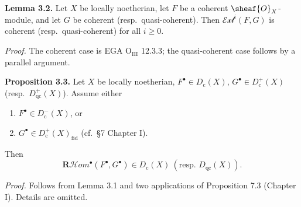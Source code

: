 \setcounter{page}{92}
\textbf{Lemma 3.2.}
Let $X$ be locally noetherian, let $F$ be a coherent $\sheaf{O}_X$-module, and let $G$ be coherent (resp.\ quasi-coherent). Then $\mathcal{Ext}^i(F,G)$ is coherent (resp.\ quasi-coherent) for all $i\ge 0$.

\textit{Proof.}
The coherent case is EGA $\mathrm{O}_{\mathrm{III}}$ 12.3.3; the quasi-coherent case follows by a parallel argument.

\textbf{Proposition 3.3.}
Let $X$ be locally noetherian, $F^\bullet\in D_\mathrm{c}(X)$, $G^\bullet\in D_\mathrm{c}^+(X)$ (resp.\ $D_\mathrm{qc}^+(X)$). Assume either
\begin{enumerate}
\item[(a)] $F^\bullet\in D_\mathrm{c}^-(X)$, or
\item[(b)] $G^\bullet\in D_\mathrm{c}^+(X)_\mathrm{fid}$ (cf.\ \S7 Chapter I).
\end{enumerate}
Then
\[
\mathbf{R}\mathcal{H}\textit{om}^\bullet(F^\bullet,G^\bullet)
\in D_\mathrm{c}(X)\ (\text{resp. } D_\mathrm{qc}(X)).
\]

\textit{Proof.}
Follows from Lemma 3.1 and two applications of Proposition 7.3 (Chapter I). Details are omitted.